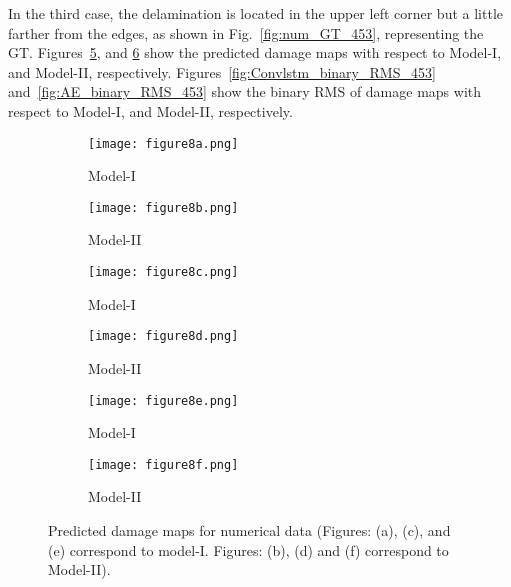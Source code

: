 \begin{sloppypar}
	
	In the third case, the delamination is located in the upper left corner but a little farther from the edges, as shown in Fig.~\ref{fig:num_GT_453}, representing the GT. 
	Figures~\ref{fig:Convlstm_num_453}, and \ref{fig:AE_num_453} show the predicted damage maps with respect to Model-I, and Model-II, respectively.
	Figures~\ref{fig:Convlstm_binary_RMS_453} and~\ref{fig:AE_binary_RMS_453} show the binary RMS of damage maps with respect to Model-I, and Model-II, respectively.
	
	\begin{figure} [!ht]
		\centering
		\begin{subfigure}[b]{0.48\textwidth}
			\centering
			\texttt{[image: figure8a.png]} 
			\caption{Model-I}
			\label{fig:Convlstm_num_391}
		\end{subfigure}
		\hfill
		\begin{subfigure}[b]{0.48\textwidth}
			\centering
			\texttt{[image: figure8b.png]}
			\caption{Model-II}
			\label{fig:AE_num_391}
		\end{subfigure}
		\par\medskip
		\begin{subfigure}[b]{0.48\textwidth}
			\centering
			\texttt{[image: figure8c.png]}
			\caption{Model-I}
			\label{fig:Convlstm_num_462}
		\end{subfigure}
		\hfill
		\begin{subfigure}[b]{0.48\textwidth}
			\centering
			\texttt{[image: figure8d.png]}
			\caption{Model-II}
			\label{fig:AE_num_462}
		\end{subfigure}
		\par\medskip
		\begin{subfigure}[b]{0.48\textwidth}
			\centering
			\texttt{[image: figure8e.png]}
			\caption{Model-I}
			\label{fig:Convlstm_num_453}
		\end{subfigure}
		\hfill	
		\begin{subfigure}[b]{0.48\textwidth}
			\centering
			\texttt{[image: figure8f.png]}
			\caption{Model-II}
			\label{fig:AE_num_453}
		\end{subfigure}
		\caption{Predicted damage maps for numerical data (Figures: (a), (c), and (e) correspond to model-I. 
			Figures: (b), (d) and (f) correspond to Model-II).}
		\label{fig:num_case}
	\end{figure} 
	

\end{sloppypar}
